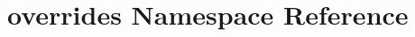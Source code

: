 \hypertarget{namespaceoverrides}{\section{overrides Namespace Reference}
\label{namespaceoverrides}
}
